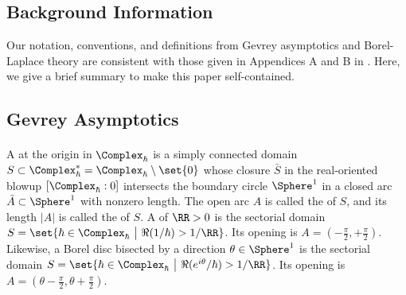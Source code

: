 \documentclass[11pt]{article}
\begin{document}
\begin{appendices}
\appendixsectionformat

\section{Background Information}
\label{211215112252}

Our notation, conventions, and definitions from Gevrey asymptotics and Borel-Laplace theory are consistent with those given in Appendices A and B in \cite{MY2008.06492}.
Here, we give a brief summary to make this paper self-contained.

\subsection{Gevrey Asymptotics}
\label{211215123326}

\paragraph{}
A  at the origin in $\Complex_\hbar$ is a simply connected domain $S \subset \Complex_\hbar^\ast = \Complex_\hbar \setminus \set{0}$ whose closure $\bar{S}$ in the real-oriented blowup $[\Complex_\hbar : 0]$ intersects the boundary circle $\Sphere^1$ in a closed arc $\bar{A} \subset \Sphere^1$ with nonzero length.
The open arc $A$ is called the  of $S$, and its length $|A|$ is called the  of $S$.
A  of  $\RR >0$ is the sectorial domain $S = \set{ \hbar \in \Complex_\hbar ~\big|~ \Re (1/\hbar) > 1/\RR }$.
Its opening is $A = (-\tfrac{\pi}{2}, + \tfrac{\pi}{2})$.
Likewise, a Borel disc bisected by a direction $\theta \in \Sphere^1$ is the sectorial domain $S = \set{ \hbar \in \Complex_\hbar ~\big|~ \Re (e^{i\theta}/\hbar) > 1/\RR }$.
Its opening is $A = (\theta -\tfrac{\pi}{2}, \theta + \tfrac{\pi}{2})$.


\end{appendices}
\end{document}
